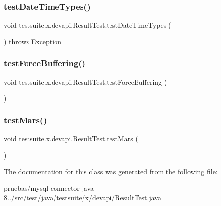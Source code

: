 \subsubsection{\texorpdfstring{test\+Date\+Time\+Types()}{testDateTimeTypes()}}
{\footnotesize\ttfamily void testsuite.\+x.\+devapi.\+Result\+Test.\+test\+Date\+Time\+Types (\begin{DoxyParamCaption}{ }\end{DoxyParamCaption}) throws Exception}

\mbox{\label{classtestsuite_1_1x_1_1devapi_1_1_result_test_a822d5c48fd1c91dfd6fde563f689bb76}} 
\subsubsection{\texorpdfstring{test\+Force\+Buffering()}{testForceBuffering()}}
{\footnotesize\ttfamily void testsuite.\+x.\+devapi.\+Result\+Test.\+test\+Force\+Buffering (\begin{DoxyParamCaption}{ }\end{DoxyParamCaption})}

\mbox{\label{classtestsuite_1_1x_1_1devapi_1_1_result_test_aac6e53867d5be2e23aa6f43200bff7bf}} 
\subsubsection{\texorpdfstring{test\+Mars()}{testMars()}}
{\footnotesize\ttfamily void testsuite.\+x.\+devapi.\+Result\+Test.\+test\+Mars (\begin{DoxyParamCaption}{ }\end{DoxyParamCaption})}



The documentation for this class was generated from the following file\+:\begin{DoxyCompactItemize}
\item 
pruebas/mysql-\/connector-\/java-\/8../src/test/java/testsuite/x/devapi/\mbox{\hyperlink{_result_test_8java}{Result\+Test.\+java}}\end{DoxyCompactItemize}
